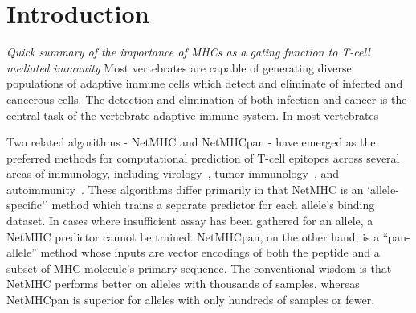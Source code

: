 \section{Introduction}
 
{\it Quick summary of the importance of MHCs as a gating function to T-cell mediated immunity}
Most vertebrates are capable of generating diverse populations of adaptive immune cells which detect and eliminate of infected and cancerous cells.
The detection and elimination of both infection and cancer is the central task of the vertebrate adaptive immune system. 
In most vertebrates \cite{Anderson_2004}




Two related algorithms - NetMHC and NetMHCpan - have emerged as the preferred methods for computational prediction of T-cell epitopes across several areas of immunology, including virology~\cite{Lund_2011}, tumor immunology~\cite{Gubin_2015}, and autoimmunity~\cite{Abreu_2012}. These algorithms differ primarily in that NetMHC is an `allele-specific'' method which trains a separate predictor for each allele's binding dataset. In cases where insufficient assay has been gathered for an allele, a NetMHC predictor cannot be trained. NetMHCpan, on the other hand, is a ``pan-allele'' method whose inputs are vector encodings of both the peptide and a subset of MHC molecule's primary sequence. The conventional wisdom is that NetMHC performs better on alleles with thousands of samples, whereas NetMHCpan is superior for alleles with only hundreds of samples or fewer. 


